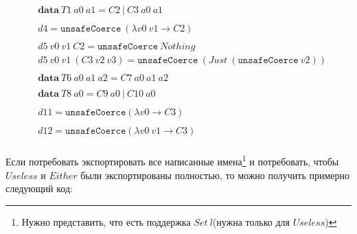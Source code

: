 \begin{align*}
&\mathbf{data}\ T1\ a0\ a1 = C2\ |\ C3\ a0\ a1\\
\\
&d4 = \texttt{unsafeCoerce}\ (\lambda v0\ v1 \rightarrow C2)\\
\\
&d5\ v0\ v1\ C2 = \texttt{unsafeCoerce}\ Nothing\\
&d5\ v0\ v1\ (C3\ v2\ v3) = \texttt{unsafeCoerce}\ (Just\ (\texttt{unsafeCoerce}\ v2))\\
\\
&\mathbf{data}\ T6\ a0\ a1\ a2 = C7\ a0\ a1\ a2\\
\\
&\mathbf{data}\ T8\ a0 = C9\ a0\ |\ C10\ a0\\
\\
&d11 = \texttt{unsafeCoerce} (\lambda v0 \rightarrow C3)\\
\\
&d12 = \texttt{unsafeCoerce} (\lambda v0\ v1 \rightarrow C3)\\
\end{align*}

Если потребовать экспортировать все написанные имена\footnote{
Нужно представить, что есть поддержка \(Set\ l\)(нужна только для \(Useless\))} и
потребовать, чтобы \(Useless\) и \(Either\) были экспортированы полностью, то
можно получить примерно следующий код:

